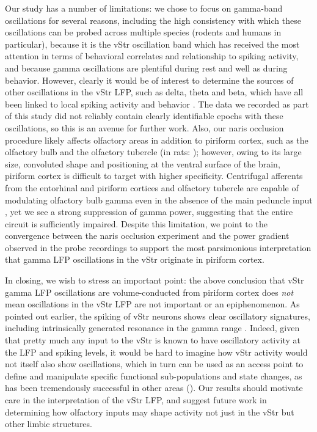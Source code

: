 \documentclass[11pt]{article}
\let\cite=\citep
\let\citeNP=\citealt
\begin{document}
Our study has a number of limitations: we chose to focus on gamma-band
oscillations for several reasons, including the high consistency with
which these oscillations can be probed across multiple species
(rodents and humans in particular), because it is the vStr oscillation
band which has received the most attention in terms of behavioral
correlates and relationship to spiking activity, and because gamma
oscillations are plentiful during rest and well as during
behavior. However, clearly it would be of interest to determine the
sources of other oscillations in the vStr LFP, such as delta, theta
and beta, which have all been linked to local spiking activity and
behavior \citep{VanderMeer2011,Howe2011,Stenner2015,
  Malhotra2015a}. The data we recorded as part of this study did not
reliably contain clearly identifiable epochs with these oscillations,
so this is an avenue for further work. Also, our naris occlusion
procedure likely affects olfactory areas in addition to piriform
cortex, such as the olfactory bulb and the olfactory tubercle (in rats: 
\citeNP{Zibrowski1997}); however, owing to its large size, convoluted
shape and positioning at the ventral surface of the brain, piriform
cortex is difficult to target with higher specificity. Centrifugal
afferents from the entorhinal and piriform cortices and olfactory
tubercle are capable of modulating olfactory bulb gamma even in the
absence of the main peduncle input \citep{Gray1988}, yet we see a
strong suppression of gamma power, suggesting that the entire circuit
is sufficiently impaired.  Despite this limitation, we point to the
convergence between the naris occlusion experiment and the power
gradient observed in the probe recordings to support the most
parsimonious interpretation that gamma LFP oscillations in the vStr
originate in piriform cortex.

In closing, we wish to stress an important point: the above conclusion
that vStr gamma LFP oscillations are volume-conducted from piriform
cortex does {\it not} mean oscillations in the vStr LFP are not
important or an epiphenomenon. As pointed out earlier, the spiking of
vStr neurons shows clear oscillatory signatures, including
intrinsically generated resonance in the gamma range
\cite{Taverna2007}. Indeed, given that pretty much any input to the
vStr is known to have oscillatory activity at the LFP and spiking
levels, it would be hard to imagine how vStr activity would not itself
also show oscillations, which in turn can be used as an access point
to define and manipulate specific functional sub-populations and state
changes, as has been tremendously successful in other areas (\citeNP{Pesaran2002, Colgin2009a, Bosman2012}). Our results should motivate care in the
interpretation of the vStr LFP, and suggest future work in
determining how olfactory inputs may shape activity not just in the
vStr but other limbic structures.


\end{document}
